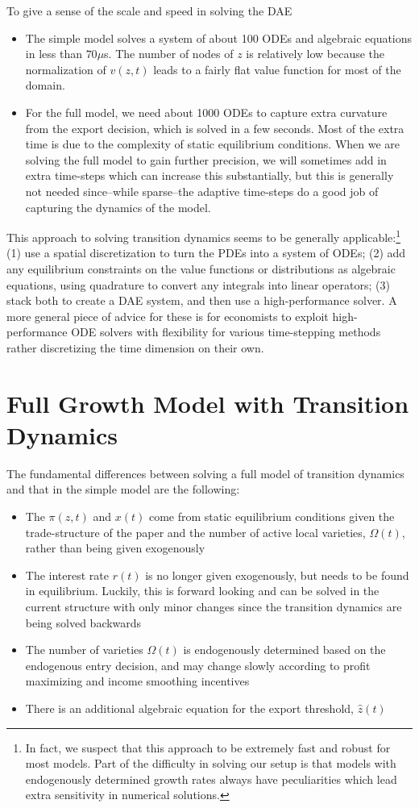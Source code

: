 \documentclass[11pt]{article}
\begin{document}
\noindent To give a sense of the scale and speed in solving the DAE
\begin{itemize}
	\item The simple model solves a system of about 100 ODEs and algebraic equations in less than $70\mu$s.  The number of nodes of $z$ is relatively low because the normalization of $v(z,t)$ leads to a fairly flat value function for most of the domain.
	\item For the full model, we need about 1000 ODEs to capture extra curvature from the export decision, which is solved in a few seconds.  Most of the extra time is due to the complexity of static equilibrium conditions.  When we are solving the full model to gain further precision, we will sometimes add in extra time-steps which can increase this substantially, but this is generally not needed since--while sparse--the adaptive time-steps do a good job of capturing the dynamics of the model.
\end{itemize}


This approach to solving transition dynamics seems to be generally applicable:\footnote{In fact, we suspect that this approach to be extremely fast and robust for most models.  Part of the difficulty in solving our setup is that models with endogenously determined growth rates always have peculiarities which lead extra sensitivity in numerical solutions.} (1) use a spatial discretization to turn the PDEs into a system of ODEs; (2) add any equilibrium constraints on the value functions or distributions as algebraic equations, using quadrature to convert any integrals into linear operators; (3) stack both to create a DAE system, and then use a high-performance solver.  A more general piece of advice for these is for economists to exploit high-performance ODE solvers with flexibility for various time-stepping methods rather discretizing the time dimension on their own.

\section{Full Growth Model with Transition Dynamics}
The fundamental differences between solving a full model of transition dynamics and that in the simple model are the following:
\begin{itemize}
	\item The $\pi(z,t)$ and $x(t)$ come from static equilibrium conditions given the trade-structure of the paper and the number of active local varieties, $\Omega(t)$, rather than being given exogenously
	\item The interest rate $r(t)$ is no longer given exogenously, but needs to be found in equilibrium.  Luckily, this is forward looking and can be solved in the current structure with only minor changes since the transition dynamics are being solved backwards
	\item The number of varieties $\Omega(t)$ is endogenously determined based on the endogenous entry decision, and may change slowly according to profit maximizing and income smoothing incentives
	\item There is an additional algebraic equation for the export threshold, $\hat{z}(t)$
\end{itemize}
\end{document}
